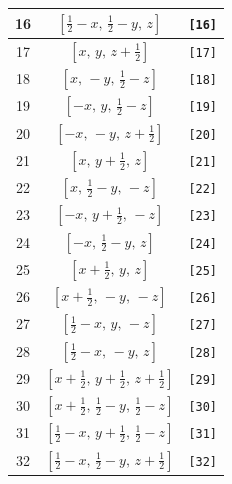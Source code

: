 \documentclass[fleqn,8pt]{jsarticle}
\begin{document}
\begin{longtable}{ccc}
16 & $\left[ \frac{1}{2} - x,\, \frac{1}{2} - y,\, z \right]$ & {\tt [16]} \\ \hline
17 & $\left[ x,\, y,\, z + \frac{1}{2} \right]$ & {\tt [17]} \\ \hline
18 & $\left[ x,\, - y,\, \frac{1}{2} - z \right]$ & {\tt [18]} \\ \hline
19 & $\left[ - x,\, y,\, \frac{1}{2} - z \right]$ & {\tt [19]} \\ \hline
20 & $\left[ - x,\, - y,\, z + \frac{1}{2} \right]$ & {\tt [20]} \\ \hline
21 & $\left[ x,\, y + \frac{1}{2},\, z \right]$ & {\tt [21]} \\ \hline
22 & $\left[ x,\, \frac{1}{2} - y,\, - z \right]$ & {\tt [22]} \\ \hline
23 & $\left[ - x,\, y + \frac{1}{2},\, - z \right]$ & {\tt [23]} \\ \hline
24 & $\left[ - x,\, \frac{1}{2} - y,\, z \right]$ & {\tt [24]} \\ \hline
25 & $\left[ x + \frac{1}{2},\, y,\, z \right]$ & {\tt [25]} \\ \hline
26 & $\left[ x + \frac{1}{2},\, - y,\, - z \right]$ & {\tt [26]} \\ \hline
27 & $\left[ \frac{1}{2} - x,\, y,\, - z \right]$ & {\tt [27]} \\ \hline
28 & $\left[ \frac{1}{2} - x,\, - y,\, z \right]$ & {\tt [28]} \\ \hline
29 & $\left[ x + \frac{1}{2},\, y + \frac{1}{2},\, z + \frac{1}{2} \right]$ & {\tt [29]} \\ \hline
30 & $\left[ x + \frac{1}{2},\, \frac{1}{2} - y,\, \frac{1}{2} - z \right]$ & {\tt [30]} \\ \hline
31 & $\left[ \frac{1}{2} - x,\, y + \frac{1}{2},\, \frac{1}{2} - z \right]$ & {\tt [31]} \\ \hline
32 & $\left[ \frac{1}{2} - x,\, \frac{1}{2} - y,\, z + \frac{1}{2} \right]$ & {\tt [32]} \\
\end{longtable}
\end{document}

